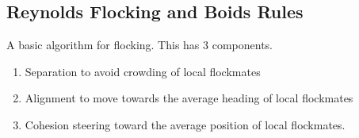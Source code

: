 \documentclass{article}
\begin{document}
\begin{itemize}
\section*{Reynolds Flocking and Boids Rules}
A basic algorithm for flocking. This has 3 components.
\begin{enumerate}
\item Separation to avoid crowding of local flockmates
\item Alignment to move towards the average heading of local flockmates
\item Cohesion steering toward the average position of local flockmates. 
\end{enumerate}


\end{itemize}
\end{document}
